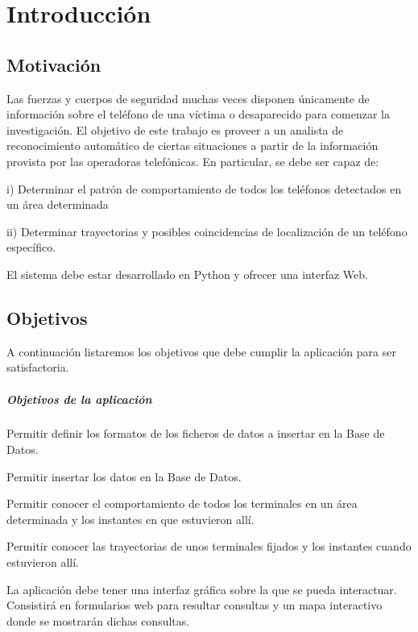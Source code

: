 \chapter{Introducción\label{CAP:INTRODUCCION}}
  \section{Motivación\label{SEC:MOTIVACION}}
    Las fuerzas y cuerpos de seguridad muchas veces disponen únicamente de información sobre el teléfono de una víctima o desaparecido para comenzar la investigación. El objetivo de este trabajo es proveer a un analista de reconocimiento automático de ciertas situaciones a partir de la información provista por las operadoras telefónicas. En particular, se debe ser capaz de:
    
    i) Determinar el patrón de comportamiento de todos los teléfonos detectados en un área determinada
    
    ii) Determinar trayectorias y posibles coincidencias de localización de un teléfono específico. 
    
    El sistema debe estar desarrollado en Python y ofrecer una interfaz Web.
  \section{Objetivos\label{SEC:OBJETIVOS}}
    A continuación listaremos los objetivos que debe cumplir la aplicación para ser satisfactoria.
    \paragraph{Objetivos de la aplicación}
    \begin{objetive}
      \item Permitir definir los formatos de los ficheros de datos a insertar en la Base de Datos.
      \item Permitir insertar los datos en la Base de Datos.
      
      \item Permitir conocer el comportamiento de todos los terminales en un área determinada y los instantes en que estuvieron allí.
      \item Permitir conocer las trayectorias de unos terminales fijados y los instantes cuando estuvieron allí.

      \item La aplicación debe tener una interfaz gráfica sobre la que se pueda interactuar. Consistirá en formularios web para resultar consultas y un mapa interactivo donde se mostrarán dichas consultas.
    \end{objetive}
  
